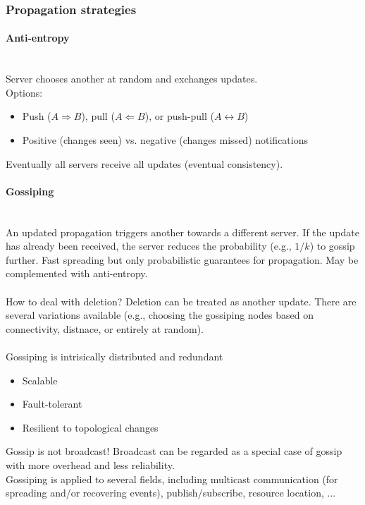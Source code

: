 \documentclass[10pt,a4paper]{article}
\newcommand{\myparagraph}[1]{\paragraph{#1}\mbox{}\\[0.05in]}
\begin{document}
\subsubsection{Propagation strategies}
\myparagraph{Anti-entropy}
Server chooses another at random and exchanges updates.\\ Options:
\begin{itemize}
	\item Push ($A \Rightarrow B$), pull ($A \Leftarrow B$), or push-pull ($A \leftrightarrow B$)
	\item Positive (changes seen) vs. negative (changes missed) notifications
\end{itemize}
Eventually all servers receive all updates (eventual consistency).
\myparagraph{Gossiping}
An updated propagation triggers another towards a different server. If the update has already been received, the server reduces the probability (e.g., $1/k$) to gossip further. Fast spreading but only probabilistic guarantees for propagation. May be complemented with anti-entropy. \\ \\
How to deal with deletion? Deletion can be treated as another update. There are several variations available (e.g., choosing the gossiping nodes based on connectivity, distnace, or entirely at random). \\ \\
Gossiping is intrisically distributed and redundant
\begin{itemize}
	\item Scalable
	\item Fault-tolerant
	\item Resilient to topological changes
\end{itemize}
Gossip is not broadcast! Broadcast can be regarded as a special case of gossip with more overhead and less reliability.\\ Gossiping is applied to several fields, including multicast communication (for spreading and/or recovering events), publish/subscribe, resource location, ...
\end{document}
